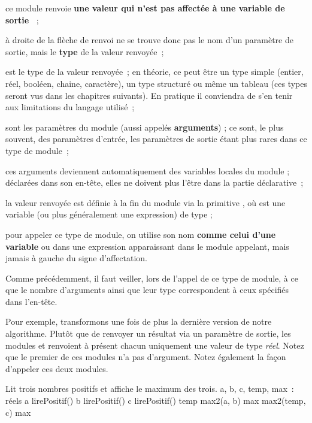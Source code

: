 	\begin{liste}
	\item 
		ce module renvoie 
		\textbf{une valeur qui n’est pas affectée à une variable de sortie~} ;
	\item 
		à droite de la flèche de renvoi ne se trouve donc pas 
		le nom d’un paramètre de sortie, 
		mais le \textbf{type} de la valeur renvoyée~;
	\item
		 est le type de la valeur renvoyée~; 
		en théorie, ce peut être un type simple 
		(entier, réel, booléen, chaine, caractère), 
		un type structuré ou même un tableau 
		(ces types seront vus dans les chapitres suivants). 
		En pratique il conviendra de s’en tenir aux limitations 
		du langage utilisé~;
	\item
		sont les paramètres du module 
		(aussi appelés \textbf{arguments}) ; 
		ce sont, le plus souvent, des paramètres d’entrée, 
		les paramètres de sortie étant plus rares 
		dans ce type de module~;
	\item
		ces arguments deviennent automatiquement 
		des variables locales du module ; 
		déclarées dans son en-tête, 
		elles ne doivent plus l’être dans la partie déclarative~;
	\item 
		la valeur renvoyée est définie à la fin du module 
		via la primitive ,
		où  est une variable 
		(ou plus généralement une expression) 
		de type  ;
	\item
		pour appeler ce type de module, 
		on utilise son nom \textbf{comme celui
		d’une variable} ou dans une expression apparaissant 
		dans le module appelant, 
		mais jamais à gauche du signe d’affectation.
	\end{liste}

	Comme précédemment, il faut veiller, lors de l’appel de ce 
	type de module, à ce que le nombre d’arguments ainsi que leur type
	correspondent à ceux spécifiés dans l’en-tête.

	Pour exemple, transformons une fois de plus la
	dernière version de notre algorithme.
	Plutôt que de renvoyer un résultat via un paramètre de sortie, 
	les modules  et
	 renvoient à présent 
	chacun uniquement une valeur de type \textit{réel}.
	Notez que le premier de ces modules n’a pas d’argument.
	Notez également la façon d’appeler ces deux modules.

	\begin{Pseudocode}
	\LComment Lit trois nombres positifs et affiche le maximum des trois.
		\Decl a, b, c, temp, max~: réels
		\Let a \Gets lirePositif()
		\Let b \Gets lirePositif()
		\Let c \Gets lirePositif()
		\Let temp \Gets max2(a, b)
		\Let max  \Gets max2(temp, c)
		\Write max
	\EndModule
	\end{Pseudocode}

